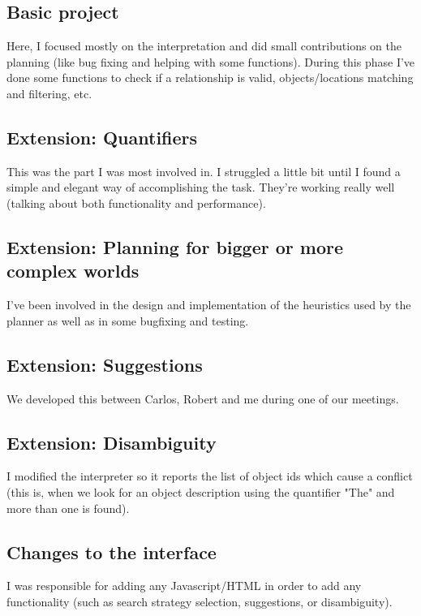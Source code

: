 \documentclass[11pt]{article}
\begin{document}
\subsection{Basic project}

Here, I focused mostly on the interpretation and did small contributions on the planning (like bug fixing and 
helping with some functions). During this phase I've done some functions to check if a relationship is valid, 
objects/locations matching and filtering, etc.

\subsection{Extension: Quantifiers}

This was the part I was most involved in. I struggled a little 
bit until I found a simple and elegant way of accomplishing the task. They're working really well (talking about both functionality and performance).

\subsection{Extension: Planning for bigger or more complex worlds}

I've been involved in the design and implementation of the heuristics used by the planner as well as in some 
bugfixing and testing.

\subsection{Extension: Suggestions}

We developed this between Carlos, Robert and me during one of our meetings.

\subsection{Extension: Disambiguity}

I modified the interpreter so it reports the list of object ids which cause a conflict (this is, 
when we look for an object description using the quantifier "The" and more than one is found).

\subsection{Changes to the interface}

I was responsible for adding any Javascript/HTML in order to add any functionality (such as search strategy selection, suggestions, or disambiguity). 
\end{document}
